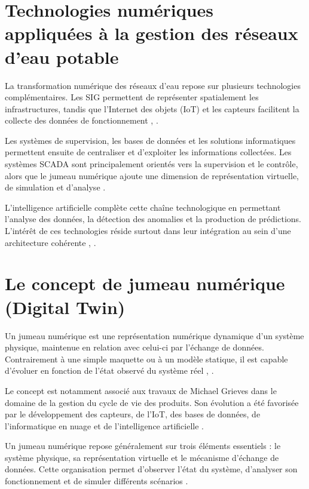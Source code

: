 \section{Technologies numériques appliquées à la gestion des réseaux d'eau potable}
\label{technologies-numeriques-appliquees-a-la-gestion-des-reseaux-deau-potable}

La transformation numérique des réseaux d'eau repose sur plusieurs
technologies complémentaires. Les SIG permettent de représenter
spatialement les infrastructures, tandis que l'Internet des objets (IoT)
et les capteurs facilitent la collecte des données de fonctionnement
\cite{ref52}, \cite{ref20}.

Les systèmes de supervision, les bases de données et les solutions
informatiques permettent ensuite de centraliser et d'exploiter les
informations collectées. Les systèmes SCADA sont principalement orientés
vers la supervision et le contrôle, alors que le jumeau numérique ajoute
une dimension de représentation virtuelle, de simulation et d'analyse
\cite{ref54}.

L'intelligence artificielle complète cette chaîne technologique en
permettant l'analyse des données, la détection des anomalies et la
production de prédictions. L'intérêt de ces technologies réside surtout
dans leur intégration au sein d'une architecture cohérente
\cite{ref55}, \cite{ref56}.

\section{Le concept de jumeau numérique (Digital Twin)}
\label{le-concept-de-jumeau-numerique-digital-twin}

Un jumeau numérique est une représentation numérique dynamique d'un
système physique, maintenue en relation avec celui-ci par l'échange de
données. Contrairement à une simple maquette ou à un modèle statique, il
est capable d'évoluer en fonction de l'état observé du système réel
\cite{ref8}, \cite{ref58}.

Le concept est notamment associé aux travaux de Michael Grieves dans le
domaine de la gestion du cycle de vie des produits. Son évolution a été
favorisée par le développement des capteurs, de l'IoT, des bases de
données, de l'informatique en nuage et de l'intelligence artificielle
\cite{ref59}.

Un jumeau numérique repose généralement sur trois éléments essentiels :
le système physique, sa représentation virtuelle et le mécanisme
d'échange de données. Cette organisation permet d'observer l'état du
système, d'analyser son fonctionnement et de simuler différents
scénarios \cite{ref60}.

